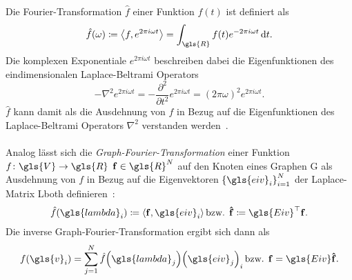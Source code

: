 Die Fourier-Transformation $\hat f$ einer Funktion $f\left(t\right)$ ist definiert als~\cite{Shuman}
\begin{equation*}
  \hat f\left(\omega\right) \coloneqq \left\langle f, e^{2\pi i\omega t} \right\rangle = \int_{\gls{R}} f\left(t\right)e^{-2\pi i\omega t}\,\mathrm{d}t.
\end{equation*}
Die komplexen Exponentiale $e^{2\pi i\omega t}$ beschreiben dabei die Eigenfunktionen des eindimensionalen Laplace-Beltrami Operators~\cite{Shuman}
\begin{equation}
  - \nabla^2 e^{2\pi i\omega t} = - \frac{\partial^2}{\partial t^2} e^{2\pi i \omega t} = {\left(2\pi \omega\right)}^2 e^{2\pi i\omega t}.
  \label{eq:laplace_eigenfunktionen}
\end{equation}
$\hat f$ kann damit als die Ausdehnung von $f$ in Bezug auf die Eigenfunktionen des Laplace-Beltrami Operators $\nabla^2$ verstanden werden~\cite{Hammond}.
\\\\
Analog lässt sich die \emph{Graph-Fourier-Transformation} einer Funktion $f \colon \gls{V} \to \gls{R}$ \bzw{} $\ve{f} \in \gls{R}^N$ auf den Knoten eines Graphen \gls{G} als Ausdehnung von $f$ in Bezug auf die Eigenvektoren ${\left\{\gls{eiv}_i\right\}}_{i=1}^N$ der Laplace-Matrix \gls{Lboth} definieren~\cite{Shuman}:
\begin{equation}
  \hat f\left(\gls{lambda}_i\right) \coloneqq \left\langle \ve{f}, \gls{eiv}_i \right\rangle\, \text{\bzw{} } \ve{\hat f} \coloneqq \gls{Eiv}^{\top}\ve{f}.
  \label{eq:graph_fourier_transformation}
\end{equation}
Die inverse Graph-Fourier-Transformation ergibt sich dann als~\cite{Shuman}
\begin{equation}
  f\left(\gls{v}_i\right) = \sum_{j=1}^N \hat f\left(\gls{lambda}_j\right) {\left(\gls{eiv}_j\right)}_i\,\text{\bzw{} }\ve{f} = \gls{Eiv}\ve{\hat f}.
  \label{eq:inverse_graph_fourier_transformation}
\end{equation}

